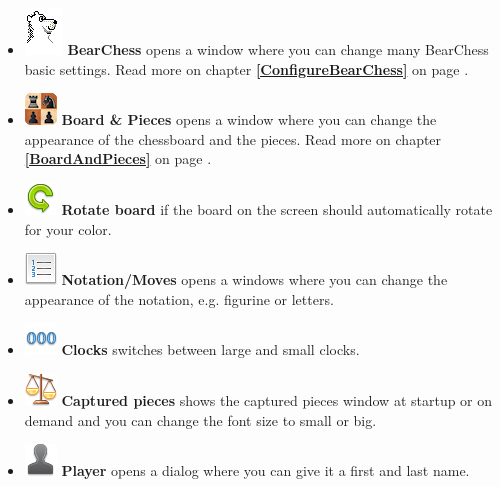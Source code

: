 \documentclass[11pt,a4paper]{article}
\begin{document}
	\begin{itemize}
		\item  \includegraphics[scale=0.6]{BearChessIcon.png} \textbf{BearChess} opens a window where you can change many BearChess basic settings.  Read more on chapter \textbf{\ref{ConfigureBearChess}  } on page \pageref{ConfigureBearChess}.
		\item  \includegraphics[scale=0.9]{Board2DPieces32.png} \textbf{Board \& Pieces} opens a window where you can change the appearance of the chessboard and the pieces.  Read more on chapter \textbf{\ref{BoardAndPieces}  } on page \pageref{BoardAndPieces}.
		\item \includegraphics[scale=0.5]{arrow_rotate_anticlockwise.png}  \textbf{Rotate board} if the board on the screen should automatically rotate for your color.
		\item  \includegraphics[scale=0.5]{text_list_numbers.png} \textbf{Notation/Moves} opens a windows where you can change the appearance of the notation, e.g. figurine or letters.
		\item  \includegraphics[scale=0.5]{digit_separator.png}  \textbf{Clocks} switches between large and small clocks.
		\item  \includegraphics[scale=0.5]{balance_unbalance.png}  \textbf{Captured pieces} shows the captured pieces window at startup or on demand and you can change the font size to small or big.
		\item  \includegraphics[scale=0.5]{user_silhouette.png}  \textbf{Player} opens a dialog where you can give it a first and last name.	

\end{itemize}
\end{document}
